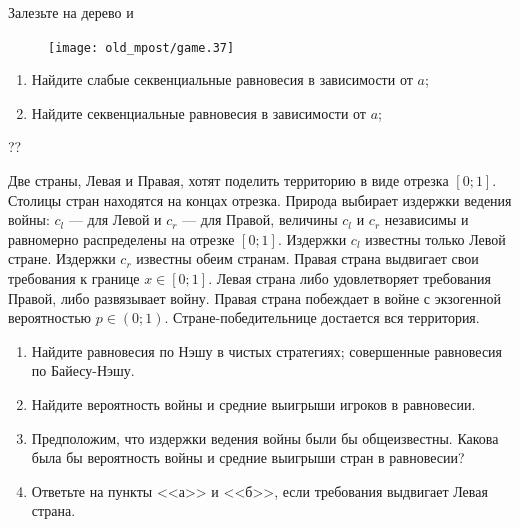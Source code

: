 \begin{problem}
\begin{source}
\cite{colell:mt}
\end{source}
Залезьте на дерево и

\begin{figure}[htbp]
     \texttt{[image: old\_mpost/game.37]}
\end{figure}


\begin{enumerate}
\item Найдите слабые секвенциальные равновесия в зависимости от  $a$;\par
\item Найдите секвенциальные равновесия в зависимости от  $a$;
\end{enumerate}


\begin{sol}

\end{sol}
\end{problem}







\begin{problem}\par
\begin{source} \cite{slanthcev:gt}?? \end{source}
Две страны, Левая и Правая, хотят поделить территорию в виде отрезка  $\left[0;1\right]$. Столицы стран находятся на концах отрезка. Природа выбирает издержки ведения войны:  $c_{l} $  --- для Левой и  $c_{r} $  --- для Правой, величины  $c_{l} $  и  $c_{r} $  независимы и равномерно распределены на отрезке  $\left[0;1\right]$. Издержки  $c_{l} $  известны только Левой стране. Издержки  $c_{r} $  известны обеим странам. Правая страна выдвигает свои требования к границе  $x\in \left[0;1\right]$. Левая страна либо удовлетворяет требования Правой, либо развязывает войну. Правая страна побеждает в войне с экзогенной вероятностью  $p\in \left(0;1\right)$. Стране-победительнице достается вся территория.\par
\begin{enumerate}
\item      Найдите равновесия по Нэшу в чистых стратегиях; совершенные равновесия по Байесу-Нэшу.\par
\item      Найдите вероятность войны и средние выигрыши игроков в равновесии.\par
\item       Предположим, что издержки ведения войны были бы общеизвестны. Какова была бы вероятность войны и средние выигрыши стран в равновесии?\par
\item      Ответьте на пункты <<а>> и <<б>>, если требования выдвигает Левая страна.
\end{enumerate}


\begin{sol}

\end{sol}
\end{problem}



